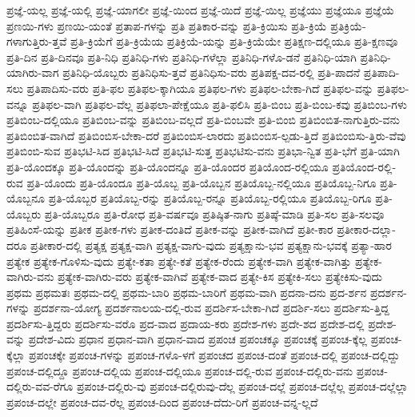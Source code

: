 {ಪ್ರಜ್ಞೆ-ಯಲ್ಲ
ಪ್ರಜ್ಞೆ-ಯಲ್ಲಿ
ಪ್ರಜ್ಞೆ-ಯಾಗಲೀ
ಪ್ರಜ್ಞೆ-ಯಿಂದ
ಪ್ರಜ್ಞೆ-ಯಿದೆ
ಪ್ರಜ್ಞೆ-ಯಿಲ್ಲ
ಪ್ರಜ್ಞೆಯು
ಪ್ರಜ್ಞೆಯೂ
ಪ್ರಜ್ಞೆಯೆ
ಪ್ರಣಯಿ-ಗಳು
ಪ್ರಣಯಿ-ಯಂತೆ
ಪ್ರತಾಪ-ಗಳನ್ನು
ಪ್ರತಿ
ಪ್ರತಿಕಾರ-ವನ್ನು
ಪ್ರತಿ-ಕ್ರಿಯಿಸು
ಪ್ರತಿ-ಕ್ರಿಯೆ
ಪ್ರತಿಕ್ರಿಯೆ-ಗಳಾಗುತ್ತಿರು-ತ್ತವೆ
ಪ್ರತಿ-ಕ್ರಿಯೆಗೆ
ಪ್ರತಿ-ಕ್ರಿಯೆಯ
ಪ್ರತಿಕ್ರಿಯೆ-ಯನ್ನು
ಪ್ರತಿ-ಕ್ರಿಯೆಯೇ
ಪ್ರತಿಕ್ಷಣ-ದಲ್ಲಿಯೂ
ಪ್ರತಿ-ಕ್ಷಣವೂ
ಪ್ರತಿ-ದಿನ
ಪ್ರತಿ-ದಿನವೂ
ಪ್ರತಿ-ನಿಧಿ
ಪ್ರತಿನಿಧಿ-ಗಳು
ಪ್ರತಿನಿಧಿ-ಗಳೆಲ್ಲಾ
ಪ್ರತಿನಿಧಿ-ಗಳೊ-ಡನೆ
ಪ್ರತಿನಿಧಿ-ಯಾಗಿ
ಪ್ರತಿನಿಧಿ-ಯಾಗಿರು-ವಾಗ
ಪ್ರತಿನಿಧಿ-ಯೊಬ್ಬರು
ಪ್ರತಿನಿಧಿಸು-ತ್ತವೆ
ಪ್ರತಿನಿಧಿಸು-ವರು
ಪ್ರತಿಪಕ್ಷ-ದವ-ರಲ್ಲಿ
ಪ್ರತಿ-ಪಾದನೆ
ಪ್ರತಿಪಾದಿ-ಸಲು
ಪ್ರತಿಪಾದಿಸು-ವರು
ಪ್ರತಿ-ಫಲ
ಪ್ರತಿಫಲ-ಕ್ಕಾಗಿಯೂ
ಪ್ರತಿಫಲ-ಗಳು
ಪ್ರತಿಫಲ-ಬೇಕಾ-ಗಿದೆ
ಪ್ರತಿಫಲ-ವನ್ನು
ಪ್ರತಿಫಲ-ವನ್ನೂ
ಪ್ರತಿಫಲ-ವಾಗಿ
ಪ್ರತಿಫಲ-ವೆಲ್ಲ
ಪ್ರತಿಫಲಾ-ಪೇಕ್ಷೆಯೂ
ಪ್ರತಿ-ಫಲಿಸಿ
ಪ್ರತಿ-ಬಿಂಬ
ಪ್ರತಿ-ಬಿಂಬ-ಕವು
ಪ್ರತಿಬಿಂಬ-ಗಳು
ಪ್ರತಿಬಿಂಬ-ದಲ್ಲಿಯೂ
ಪ್ರತಿಬಿಂಬ-ವನ್ನು
ಪ್ರತಿಬಿಂಬ-ವಲ್ಲದೆ
ಪ್ರತಿ-ಬಿಂಬವೇ
ಪ್ರತಿ-ಬಿಂಬಿ
ಪ್ರತಿಬಿಂಬಿತ-ನಾಗುತ್ತಿರು-ವನು
ಪ್ರತಿಬಿಂಬಿತ-ವಾಗಿದೆ
ಪ್ರತಿಬಿಂಬಿಸ-ಬೇಕಾ-ದರೆ
ಪ್ರತಿಬಿಂಬಿಸ-ಲಾರದು
ಪ್ರತಿಬಿಂಬಿಸ-ಲ್ಪಡು-ತ್ತಿದೆ
ಪ್ರತಿಬಿಂಬಿಸು-ತ್ತಿರು-ವೆವು
ಪ್ರತಿಬಿಂಬಿ-ಸುವ
ಪ್ರತಿಭಟಿ-ಸಿದ
ಪ್ರತಿಭಟಿ-ಸಿದೆ
ಪ್ರತಿಭಟಿ-ಸುತ್ತ
ಪ್ರತಿಭಟಿಸು-ವನು
ಪ್ರತಿಭಾ-ನ್ವಿತ
ಪ್ರತಿ-ಭೆಗೆ
ಪ್ರತಿ-ಯಾಗಿ
ಪ್ರತಿ-ಯೊಂದಕ್ಕೂ
ಪ್ರತಿ-ಯೊಂದನ್ನು
ಪ್ರತಿ-ಯೊಂದನ್ನೂ
ಪ್ರತಿ-ಯೊಂದರ
ಪ್ರತಿಯೊಂದ-ರಲ್ಲಿಯೂ
ಪ್ರತಿಯೊಂದ-ರಲ್ಲಿ-ರುವ
ಪ್ರತಿ-ಯೊಂದು
ಪ್ರತಿ-ಯೊಂದೂ
ಪ್ರತಿ-ಯೊಬ್ಬ
ಪ್ರತಿ-ಯೊಬ್ಬನ
ಪ್ರತಿಯೊಬ್ಬ-ನಲ್ಲಿಯೂ
ಪ್ರತಿಯೊಬ್ಬ-ನಿಗೂ
ಪ್ರತಿ-ಯೊಬ್ಬನೂ
ಪ್ರತಿ-ಯೊಬ್ಬರ
ಪ್ರತಿಯೊಬ್ಬ-ರನ್ನು
ಪ್ರತಿಯೊಬ್ಬ-ರನ್ನೂ
ಪ್ರತಿಯೊಬ್ಬ-ರಲ್ಲಿಯೂ
ಪ್ರತಿಯೊಬ್ಬ-ರಿಗೂ
ಪ್ರತಿ-ಯೊಬ್ಬರು
ಪ್ರತಿ-ಯೊಬ್ಬರೂ
ಪ್ರತಿ-ರೋಧ
ಪ್ರತಿ-ವರ್ಷವೂ
ಪ್ರತಿಷ್ಠಿತ-ನಾಗು
ಪ್ರತಿಷ್ಠೆ-ಮಾಡಿ
ಪ್ರತಿ-ಸಲ
ಪ್ರತಿ-ಸಲವೂ
ಪ್ರತಿಹಿಂಸೆ-ಯನ್ನು
ಪ್ರತೀಕ
ಪ್ರತೀಕ-ಗಳು
ಪ್ರತೀಕ-ದಂತಿದೆ
ಪ್ರತೀಕ-ವನ್ನು
ಪ್ರತೀಕ-ವಾಗಿದೆ
ಪ್ರತೀ-ಕಾರ
ಪ್ರತೀಕಾರ-ದಲ್ಲಾ-ದರೂ
ಪ್ರತೀಕಾರ-ದಲ್ಲಿ
ಪ್ರತ್ಯಕ್ಷ
ಪ್ರತ್ಯಕ್ಷ-ವಾಗಿ
ಪ್ರತ್ಯಕ್ಷ-ವಾಗು-ವುದು
ಪ್ರತ್ಯಕ್ಷಾನು-ಭವ
ಪ್ರತ್ಯಕ್ಷಾನು-ಭವಕ್ಕೆ
ಪ್ರತ್ಯಾ-ಹಾರ
ಪ್ರತ್ಯೇಕ
ಪ್ರತ್ಯೇಕ-ಗೊಳಿಸು-ವುದು
ಪ್ರತ್ಯೇ-ಕತಾ
ಪ್ರತ್ಯೇ-ಕತೆ
ಪ್ರತ್ಯೇಕ-ರೆಂದು
ಪ್ರತ್ಯೇಕ-ವಾಗಿ
ಪ್ರತ್ಯೇಕ-ವಾಗಿತ್ತು
ಪ್ರತ್ಯೇಕ-ವಾಗಿರು-ವನು
ಪ್ರತ್ಯೇಕ-ವಾಗಿರು-ವರು
ಪ್ರತ್ಯೇಕ-ವಾಗಿವೆ
ಪ್ರತ್ಯೇಕ-ವಾದ
ಪ್ರತ್ಯೇ-ಕಿಸ
ಪ್ರತ್ಯೇಕಿ-ಸಲು
ಪ್ರತ್ಯೇಕಿಸು-ವುದು
ಪ್ರಥಮ
ಪ್ರಥಮತಃ
ಪ್ರಥಮ-ದಲ್ಲಿ
ಪ್ರಥಮ-ಬಾರಿ
ಪ್ರಥಮ-ಬಾರಿಗೆ
ಪ್ರಥಮ-ವಾಗಿ
ಪ್ರದನಾ-ದನು
ಪ್ರದ-ರ್ಶನ
ಪ್ರದರ್ಶನ-ಗಳನ್ನು
ಪ್ರದರ್ಶನಾ-ಯೋಗ್ಯ
ಪ್ರದರ್ಶನಾಲಯ-ದಲ್ಲಿ-ರುವ
ಪ್ರದರ್ಶಿಸ-ಬೇಕಾ-ಗಿದೆ
ಪ್ರದರ್ಶಿ-ಸಲು
ಪ್ರದರ್ಶಿಸು-ತ್ತಿದ್ದ
ಪ್ರದರ್ಶಿಸು-ತ್ತಿದ್ದರು
ಪ್ರದರ್ಶಿಸು-ವರೊ
ಪ್ರದ-ವಾದ
ಪ್ರದಾಯ-ಕರು
ಪ್ರದೇಶ-ಗಳು
ಪ್ರದೇ-ಶದ
ಪ್ರದೇಶ-ದಲ್ಲಿ
ಪ್ರದೇಶ-ವನ್ನು
ಪ್ರದೇಶ-ವಿದು
ಪ್ರಧಾನ
ಪ್ರಧಾನ-ವಾಗಿ
ಪ್ರಧಾನ-ವಾದ
ಪ್ರಪಂಚ
ಪ್ರಪಂಚಕ್ಕೂ
ಪ್ರಪಂಚಕ್ಕೆ
ಪ್ರಪಂಚ-ಕ್ಕೆಲ್ಲ
ಪ್ರಪಂಚ-ಕ್ಕೆಲ್ಲಾ
ಪ್ರಪಂಚಕ್ಕೇ
ಪ್ರಪಂಚ-ಗಳನ್ನು
ಪ್ರಪಂಚ-ಗಳೊ-ಳಗೆ
ಪ್ರಪಂಚದ
ಪ್ರಪಂಚ-ದಂತೆ
ಪ್ರಪಂಚ-ದಲ್ಲಿ
ಪ್ರಪಂಚ-ದಲ್ಲಿದ್ದು
ಪ್ರಪಂಚ-ದಲ್ಲಿದ್ದೂ
ಪ್ರಪಂಚ-ದಲ್ಲಿಯ
ಪ್ರಪಂಚ-ದಲ್ಲಿಯೂ
ಪ್ರಪಂಚ-ದಲ್ಲಿ-ರುವ
ಪ್ರಪಂಚ-ದಲ್ಲಿರು-ವನು
ಪ್ರಪಂಚ-ದಲ್ಲಿರು-ವವ-ರೆಗೂ
ಪ್ರಪಂಚ-ದಲ್ಲಿರು-ವು
ಪ್ರಪಂಚ-ದಲ್ಲಿರುವು-ದೆಲ್ಲ
ಪ್ರಪಂಚ-ದಲ್ಲೆ
ಪ್ರಪಂಚ-ದಲ್ಲೆಲ್ಲ
ಪ್ರಪಂಚ-ದಲ್ಲೆಲ್ಲಾ
ಪ್ರಪಂಚ-ದಲ್ಲೇ
ಪ್ರಪಂಚ-ದವ-ರೆಲ್ಲ
ಪ್ರಪಂಚ-ದಿಂದ
ಪ್ರಪಂಚ-ದೆದು-ರಿಗೆ
ಪ್ರಪಂಚ-ವನ್ನ-ಲ್ಲದೆ
}
